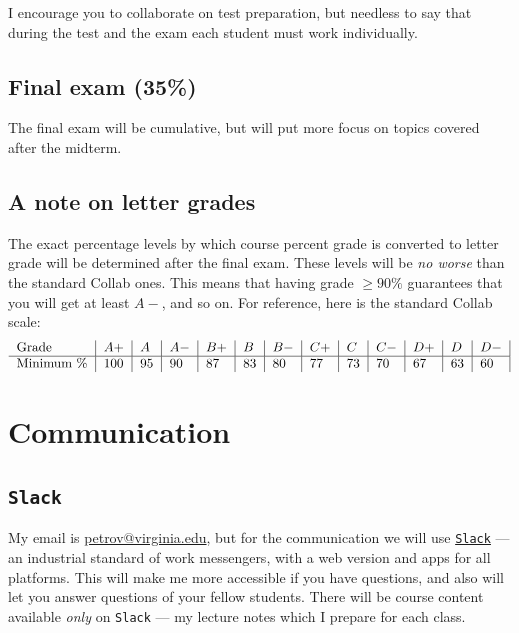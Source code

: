 \documentclass[oneside,11pt]{amsart}
\begin{document}
I encourage you to collaborate on test preparation, but needless to say that
during the test and the exam each student must work individually.

\subsection{Final exam (35\%)}

The final exam will be cumulative, but will put more focus on topics covered after the midterm.

\subsection*{A note on letter grades}

The exact percentage levels 
by which course percent grade is converted to letter grade
will be determined after the final exam. 
These levels will be \emph{no worse} than the standard Collab ones. 
This means that having grade $\ge 90\%
$
guarantees that you will get at least $A-$, and so on.
For reference, here is the standard Collab scale:
\begin{equation*}
	\begin{tabular}{l|l|l|l|l|l|l|l|l|l|l|l|l|}
		Grade      & $ A+	$ & $A	$ & $A-	$ & $B+	$ & $B	$ & $B-	$ & $C+	$ & $C	$ & $C-	$ & $D+	$ & $D	$ & $D-$ \\
		\hline
		Minimum \% & 100     & 95   & 90    & 87    & 83    & 80    & 77    & 73    & 70    & 67    & 63    & 60
	\end{tabular}
\end{equation*}


\section{Communication}
\label{comm}

\subsection{\texttt{Slack}}

My email is \href{mailto:petrov@virginia.edu}{petrov@virginia.edu}, but for the
communication we will use \href{https://slack.com}{\texttt{Slack}} --- an
industrial standard of work messengers, with a web version and apps for all
platforms. This will make me more accessible if you have questions, and also
will let you answer questions of your fellow students. There will be course
content available \emph{only} on \texttt{Slack} --- my
lecture notes which I prepare for each class.
\end{document}
